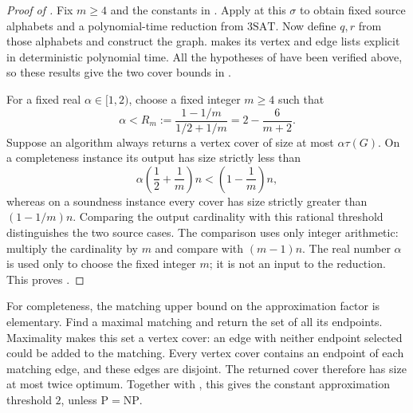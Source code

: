 \begin{proof}[Proof of ]
Fix \(m\geq4\) and the constants in .
Apply  at this \(\sigma\) to obtain fixed
source alphabets and a polynomial-time reduction from \(\mathrm{3SAT}\).
Now define \(q,r\) from those alphabets and construct the graph.
 makes its vertex and edge lists explicit in
deterministic polynomial time. All the hypotheses of
 have been verified above, so
these results give the two cover bounds in .

For a fixed real \(\alpha\in[1,2)\), choose a fixed integer
\(m\geq4\) such that
\begin{equation}
 \alpha<R_m:=\frac{1-1/m}{1/2+1/m}
       =2-\frac6{m+2}.
\label{eq:gap-ratio}
\end{equation}
Suppose an algorithm always returns a vertex cover of size at most
\(\alpha\tau(G)\). On a completeness instance its output has
size strictly less than
\[
 \alpha\left(\frac12+\frac1m\right)n
 <\left(1-\frac1m\right)n,
\]
whereas on a soundness instance every cover has size strictly greater
than \((1-1/m)n\). Comparing the output cardinality with this
rational threshold distinguishes the two source cases. The comparison
uses only integer arithmetic: multiply the cardinality by \(m\)
and compare with \((m-1)n\). The real number \(\alpha\) is used
only to choose the fixed integer \(m\); it is not an input to the
reduction. This proves .
\end{proof}

For completeness, the matching upper bound on the approximation
factor is elementary. Find a maximal matching and return the set of
all its endpoints. Maximality makes this set a vertex cover: an edge
with neither endpoint selected could be added to the matching.
Every vertex cover contains an endpoint of each matching edge, and
these edges are disjoint. The returned cover therefore has size at
most twice optimum. Together with , this gives the
constant approximation threshold \(2\), unless
\(\mathrm P=\mathrm{NP}\).
